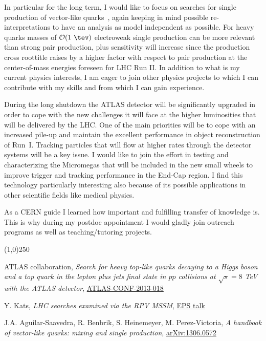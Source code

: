 \documentclass[a4paper,10pt]{article}
\begin{document}
In particular for the long term, I would like to focus on searches for single production of vector-like quarks~\cite{JuanAntonio}, again keeping 
in mind possible re-interpretations to have an analysis as model independent as possible. For heavy quarks masses of $\mathcal{O}(1~\tev)$
electroweak single production can be more relevant than strong pair production, plus sensitivity will increase since the production cross
roottitle raises by a higher factor with respect to pair production at the center-of-mass energies foreseen for LHC Run II.
In addition to what is my current physics interests, I am eager to join other physics projects to which I can contribute
with my skills and from which I can gain experience.



During the long shutdown the ATLAS detector will be significantly upgraded in order to cope with the new challenges it will face
at the higher luminosities that will be delivered by the LHC. One of the main priorities will be to cope with an increased pile-up and maintain
the excellent performance in object reconstruction of Run~I. Tracking particles that will flow at higher rates through the detector
systems will be a key issue. I would like to join the effort in testing and characterizing the Micromegas that will be included in the
new small wheels to improve trigger and tracking performance in the End-Cap region. I find this technology particularly interesting
also because of its possible applications in other scientific fields like medical physics.


As a CERN guide I learned how important and fulfilling transfer of knowledge is. This is why during my
postdoc appointment I would gladly join outreach programs as well as
teaching/tutoring projects.



\myskip
\vfill

\line(1,0){250}
\scriptsize
{}
\begingroup
\renewcommand{\roottitle}[2]{}%
\begin{thebibliography}{9}

  ATLAS collaboration,
  \emph{Search for heavy top-like quarks decaying to a Higgs boson and a top quark in the lepton plus jets final state in $pp$ collisions at $\sqrt{s}=8$ TeV with the ATLAS detector},
  \href{http://atlas.web.cern.ch/Atlas/GROUPS/PHYSICS/CONFNOTES/ATLAS-CONF-2013-018}{ATLAS-CONF-2013-018}

  Y. Kats,
  \emph{LHC searches examined via the RPV MSSM},
  \href{http://indico.cern.ch/contributionDisplay.py?sessionId=15&contribId=668&confId=218030}{EPS talk}

  J.A. Aguilar-Saavedra, R. Benbrik, S. Heinemeyer, M. Perez-Victoria,
  \emph{A handbook of vector-like quarks: mixing and single production},
  \href{http://arxiv.org/abs/1306.0572}{arXiv:1306.0572}


\end{thebibliography}
\endgroup
\end{document}
